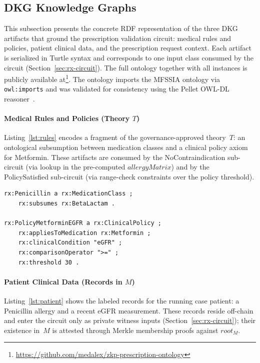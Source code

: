 \documentclass[journal]{IEEEtran}
\begin{document}
\subsection{DKG Knowledge Graphs}
\label{ss:dkg-knowledge-graphs}

This subsection presents the concrete RDF representation of the three
DKG artifacts that ground the prescription validation circuit:
medical rules and policies, patient clinical data,
and the prescription request context. Each artifact
is serialized in Turtle syntax and corresponds to one input class
consumed by the circuit (Section~\ref{sec:rx-circuit}). The full
ontology together with all instances is publicly available
at\footnote{\url{https://github.com/medalex/zkp-prescription-ontology}}.
The ontology imports the MFSSIA ontology via \texttt{owl:imports}
and was validated for consistency using the Pellet OWL-DL
reasoner~\cite{pellet}.

\paragraph{Medical Rules and Policies (Theory $T$)}
Listing~\ref{lst:rules} encodes a fragment of the
governance-approved theory~$T$: an ontological subsumption between
medication classes and a clinical policy axiom for Metformin. These
artifacts are consumed by the NoContraindication sub-circuit
(via lookup in the pre-computed $\mathit{allergyMatrix}$) and by the PolicySatisfied
sub-circuit (via range-check constraints over the policy threshold).

\begin{lstlisting}[caption={Medical Rules and Policies},label={lst:rules},language=turtle,basicstyle=\ttfamily\footnotesize]
rx:Penicillin a rx:MedicationClass ;
    rx:subsumes rx:BetaLactam .

rx:PolicyMetforminEGFR a rx:ClinicalPolicy ;
    rx:appliesToMedication rx:Metformin ;
    rx:clinicalCondition "eGFR" ;
    rx:comparisonOperator ">=" ;
    rx:threshold 30 .
\end{lstlisting}

\paragraph{Patient Clinical Data (Records in $M$)}
Listing~\ref{lst:patient} shows the labeled records for the running
case patient: a Penicillin allergy and a recent eGFR measurement.
These records reside off-chain and enter the circuit only as private
witness inputs (Section~\ref{sec:rx-circuit}); their existence
in~$M$ is attested through Merkle membership proofs against
$\mathit{root}_M$.
\end{document}
